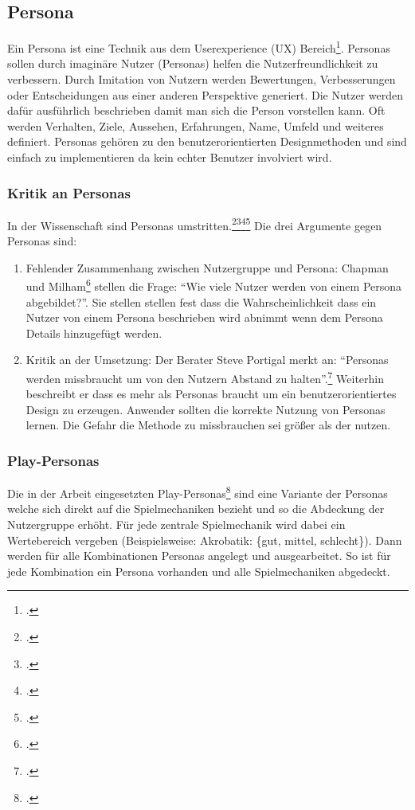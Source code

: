 \subsection{Persona}\label{ssec:persona}
	Ein Persona ist eine Technik aus dem Userexperience (UX) Bereich\footcite{persona}. Personas sollen durch imaginäre Nutzer (Personas) helfen die Nutzerfreundlichkeit zu verbessern. Durch Imitation von Nutzern werden Bewertungen, Verbesserungen oder Entscheidungen aus einer anderen Perspektive generiert. Die Nutzer werden dafür ausführlich beschrieben damit man sich die Person vorstellen kann. Oft werden Verhalten, Ziele, Aussehen, Erfahrungen, Name, Umfeld und weiteres definiert.
	Personas gehören zu den benutzerorientierten Designmethoden und sind einfach zu implementieren da kein echter Benutzer involviert wird.
	\subsubsection{Kritik an Personas}
		In der Wissenschaft sind Personas umstritten.\footcite{persona-crit}\footcite{persona-crit2}\footcite{persona-crit3}\footcite{persona-crit4} Die drei Argumente gegen Personas sind:
		\begin{enumerate}\obeylines
			\item{ Fehlender Zusammenhang zwischen Nutzergruppe und Persona: Chapman und Milham\footcite{persona-crit} stellen die Frage: \enquote{Wie viele Nutzer werden von einem Persona abgebildet?}. Sie stellen stellen fest dass die Wahrscheinlichkeit dass ein Nutzer von einem Persona beschrieben wird abnimmt wenn dem Persona Details hinzugefügt werden. }
			\item{ Kritik an der Umsetzung: Der Berater Steve Portigal merkt an: \enquote{Personas werden missbraucht um von den Nutzern Abstand zu halten}.\footcite[Übersetzt aus dem Orginal: \enquote{Personas are misused to maintain a “safe” distance from the people we design for [\dots]}]{persona-crit4}
			Weiterhin beschreibt er dass es mehr als Personas braucht um ein benutzerorientiertes Design zu erzeugen. Anwender sollten die korrekte Nutzung von Personas lernen.
			Die Gefahr die Methode zu missbrauchen sei größer als der nutzen. }
		\end{enumerate}
	\subsubsection{Play-Personas}
		Die in der Arbeit eingesetzten Play-Personas\footcite{play-persona} sind eine Variante der Personas welche sich direkt auf die Spielmechaniken bezieht und so die Abdeckung der Nutzergruppe erhöht. Für jede zentrale Spielmechanik wird dabei ein Wertebereich vergeben (Beispielsweise: Akrobatik: \{gut, mittel, schlecht\}). Dann werden für alle Kombinationen Personas angelegt und ausgearbeitet. So ist für jede Kombination ein Persona vorhanden und alle Spielmechaniken abgedeckt.


